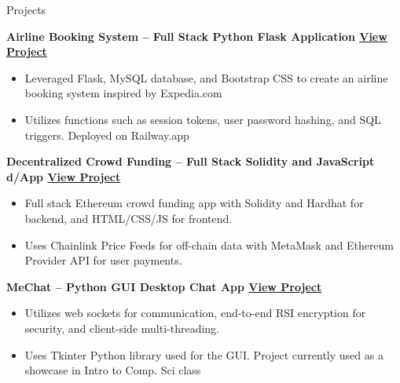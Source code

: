 \documentclass{cv} %
\begin{document}
\begin{rSection}{Projects}

	\textbf{Airline Booking System – Full Stack Python Flask Application \href{https://github.com/larry-lime/airline-ticket-system}{View Project}}
	\begin{itemize}
		\item Leveraged Flask, MySQL database, and Bootstrap CSS to create an airline booking system inspired by Expedia.com
		\item Utilizes functions such as session tokens, user password hashing, and SQL triggers. Deployed on Railway.app
	\end{itemize}

	\textbf{Decentralized Crowd Funding – Full Stack Solidity and JavaScript d/App \href{https://lawrencelim.xyz/project/hh-fund-me/}{View Project}}
	\begin{itemize}
		\item Full stack Ethereum crowd funding app with Solidity and Hardhat for backend, and HTML/CSS/JS for frontend.
		\item Uses Chainlink Price Feeds for off-chain data with MetaMask and Ethereum Provider API for user payments.
	\end{itemize}

	\textbf{MeChat – Python GUI Desktop Chat App \href{https://lawrencelim.xyz/project/mechat/}{View Project}}
	\begin{itemize}
		\item Utilizes web sockets for communication, end-to-end RSI encryption for security, and client-side multi-threading.
		\item Uses Tkinter Python library used for the GUI. Project currently used as a showcase in Intro to Comp. Sci class
	\end{itemize}

\end{rSection}
\end{document}
